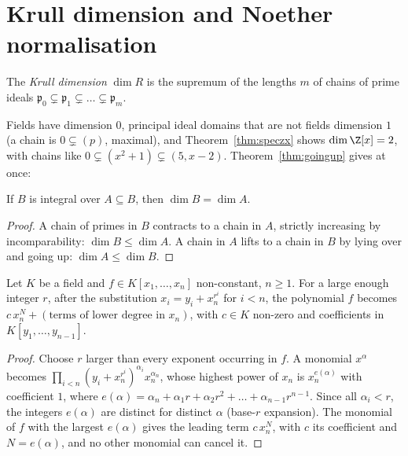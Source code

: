 \section{Krull dimension and Noether normalisation}

\begin{definition}\label{def:krulldim}
The \emph{Krull dimension} $\dim R$ is the supremum of the lengths $m$ of chains of prime ideals $\mathfrak p_0\subsetneq\mathfrak p_1\subsetneq\dots\subsetneq\mathfrak p_m$.
\end{definition}

Fields have dimension $0$, principal ideal domains that are not fields dimension $1$ (a chain is $0\subsetneq(p)$, maximal), and Theorem~\ref{thm:speczx} shows $\dim\Z[x]=2$, with chains like $0\subsetneq(x^2+1)\subsetneq(5,x-2)$.
Theorem~\ref{thm:goingup} gives at once:

\begin{corollary}\label{cor:dimintegral}
If $B$ is integral over $A\subseteq B$, then $\dim B=\dim A$.
\end{corollary}

\begin{proof}
A chain of primes in $B$ contracts to a chain in $A$, strictly increasing by incomparability: $\dim B\le\dim A$. A chain in $A$ lifts to a chain in $B$ by lying over and going up: $\dim A\le\dim B$.
\end{proof}

\begin{lemma}\label{lem:noethervar}
Let $K$ be a field and $f\in K[x_1,\dots,x_n]$ non-constant, $n\ge1$. For a large enough integer $r$, after the substitution $x_i=y_i+x_n^{r^i}$ for $i<n$, the polynomial $f$ becomes $c\,x_n^N+(\text{terms of lower degree in }x_n)$, with $c\in K$
non-zero and coefficients in $K[y_1,\dots,y_{n-1}]$.
\end{lemma}

\begin{proof}
Choose $r$ larger than every exponent occurring in $f$. A monomial $x^\alpha$ becomes $\prod_{i<n}(y_i+x_n^{r^i})^{\alpha_i}x_n^{\alpha_n}$, whose highest power of $x_n$ is $x_n^{e(\alpha)}$ with coefficient $1$, where
$e(\alpha)=\alpha_n+\alpha_1r+\alpha_2r^2+\dots+\alpha_{n-1}r^{n-1}$. Since all $\alpha_i<r$, the integers $e(\alpha)$ are distinct for distinct $\alpha$ (base-$r$ expansion). The monomial of $f$ with the largest $e(\alpha)$ gives the leading
term $c\,x_n^N$, with $c$ its coefficient and $N=e(\alpha)$, and no other monomial can cancel it.
\end{proof}

